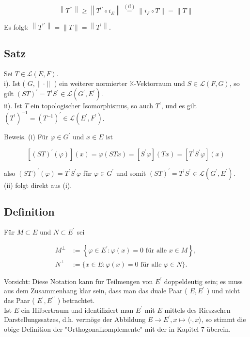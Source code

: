 \documentclass[10pt, letterpaper]{article}
\begin{document}
$$
\left\|T^{\prime \prime}\right\| \geq\left\|T^{\prime \prime} \circ i_{E}\right\| \stackrel{(i i)}{=}\left\|i_{F} \circ T\right\|=\|T\|
$$

Es folgt: $\left\|T^{\prime \prime}\right\|=\|T\|=\left\|T^{\prime}\right\|$.

\subsection*{Satz}
Sei $T \in \mathcal{L}(E, F)$.\\
i). Ist ( $G,\|\cdot\|$ ) ein weiterer normierter $\mathbb{K}$-Vektorraum und $S \in \mathcal{L}(F, G)$, so gilt $(S T)^{\prime}=T^{\prime} S^{\prime} \in \mathcal{L}\left(G^{\prime}, E^{\prime}\right)$.\\
ii). Ist $T$ ein topologischer Isomorphismus, so auch $T^{\prime}$, und es gilt $\left(T^{\prime}\right)^{-1}= \left(T^{-1}\right)^{\prime} \in \mathcal{L}\left(E^{\prime}, F^{\prime}\right)$.

Beweis. (i) Für $\varphi \in G^{\prime}$ und $x \in E$ ist

$$
\left[(S T)^{\prime}(\varphi)\right](x)=\varphi(S T x)=\left[S^{\prime} \varphi\right](T x)=\left[T^{\prime} S^{\prime} \varphi\right](x)
$$

also $(S T)^{\prime}(\varphi)=T^{\prime} S^{\prime} \varphi$ für $\varphi \in G^{\prime}$ und somit $(S T)^{\prime}=T^{\prime} S^{\prime} \in \mathcal{L}\left(G^{\prime}, E^{\prime}\right)$.\\
(ii) folgt direkt aus (i).

\subsection*{Definition}
Für $M \subset E$ und $N \subset E^{\prime}$ sei

$$
\begin{aligned}
M^{\perp} & :=\left\{\varphi \in E^{\prime}: \varphi(x)=0 \text { für alle } x \in M\right\}, \\
N^{\perp} & :=\{x \in E: \varphi(x)=0 \text { für alle } \varphi \in N\} .
\end{aligned}
$$

Vorsicht: Diese Notation kann für Teilmengen von $E^{\prime}$ doppeldeutig sein; es muss aus dem Zusammenhang klar sein, dass man das duale Paar ( $E, E^{\prime}$ ) und nicht das Paar ( $E^{\prime}, E^{\prime \prime}$ ) betrachtet.\\
Ist $E$ ein Hilbertraum und identifiziert man $E^{\prime}$ mit $E$ mittels des Rieszschen Darstellungssatzes, d.h. vermöge der Abbildung $E \rightarrow E^{\prime}, x \mapsto\langle\cdot, x\rangle$, so stimmt die obige Definition der "Orthogonalkomplemente" mit der in Kapitel 7 überein.
\end{document}
